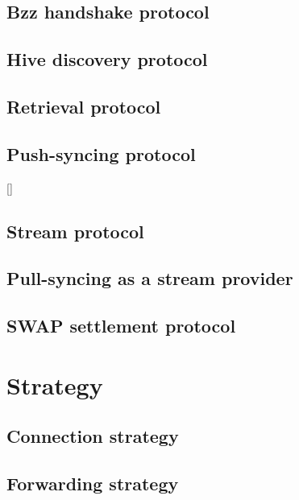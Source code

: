 \section{Bzz  handshake protocol}\label{spec:protocol:bzz}
\green{}

\section{Hive discovery protocol}\label{spec:protocol:hive}
\green{}

\section{Retrieval protocol}\label{spec:protocol:retrieval}
\red{}

\section{Push-syncing protocol}\label{spec:protocol:push-sync}
\ref{}

\section{Stream protocol}\label{spec:protocol:stream}

\section{Pull-syncing as a stream provider}\label{spec:protocol:pull-sync}
\red{}

\section{SWAP settlement protocol}\label{spec:protocol:swap}
\red{}



\chapter{Strategy}\label{spec:strategy}

\red{}
\section{Connection strategy}\label{spec:strategy:connection}
%
\section{Forwarding strategy}\label{spec:strategy:forwarding}

